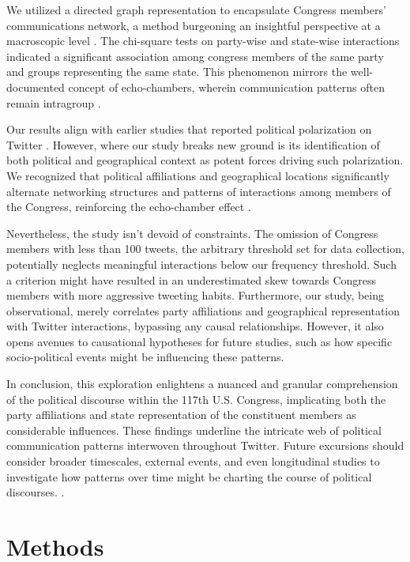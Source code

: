 \documentclass[11pt]{article}
\begin{document}
We utilized a directed graph representation to encapsulate Congress members' communications network, a method burgeoning an insightful perspective at a macroscopic level \cite{Yan2014AsymptoticsID}. The chi-square tests on party-wise and state-wise interactions indicated a significant association among congress members of the same party and groups representing the same state. This phenomenon mirrors the well-documented concept of echo-chambers, wherein communication patterns often remain intragroup \cite{Barber2016LessIM}.

Our results align with earlier studies that reported political polarization on Twitter \cite{Jiang2020PoliticalPD, Bail2019AssessingTR}. However, where our study breaks new ground is its identification of both political and geographical context as potent forces driving such polarization. We recognized that political affiliations and geographical locations significantly alternate networking structures and patterns of interactions among members of the Congress, reinforcing the echo-chamber effect \cite{Barber2016LessIM, Etta2021NewsCA}.

Nevertheless, the study isn't devoid of constraints. The omission of Congress members with less than 100 tweets, the arbitrary threshold set for data collection, potentially neglects meaningful interactions below our frequency threshold. Such a criterion might have resulted in an underestimated skew towards Congress members with more aggressive tweeting habits. Furthermore, our study, being observational, merely correlates party affiliations and geographical representation with Twitter interactions, bypassing any causal relationships. However, it also opens avenues to causational hypotheses for future studies, such as how specific socio-political events might be influencing these patterns.

In conclusion, this exploration enlightens a nuanced and granular comprehension of the political discourse within the 117th U.S. Congress, implicating both the party affiliations and state representation of the constituent members as considerable influences. These findings underline the intricate web of political communication patterns interwoven throughout Twitter. Future excursions should consider broader timescales, external events, and even longitudinal studies to investigate how patterns over time might be charting the course of political discourses. \cite{Ekstrm2018SocialMP, Farkas2020ImagesPA, Mir2023ExploringTP}.

\section*{Methods}
\end{document}
